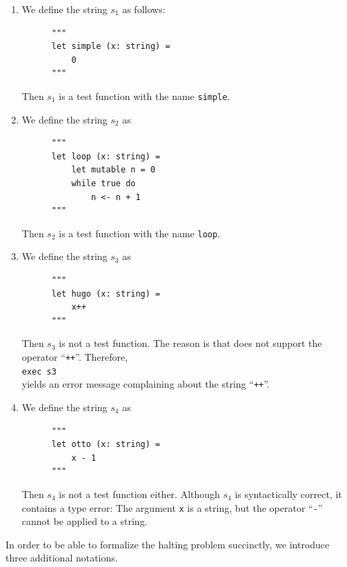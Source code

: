 \examplesEng
\begin{enumerate}
\item We define the string $s_1$ as follows:
      \begin{verbatim}
      """
      let simple (x: string) = 
          0
      """
      \end{verbatim}
      \vspace*{-0.8cm}

      Then $s_1$ is a test function with the name \texttt{simple}.
\item We define the string $s_2$ as
      \begin{verbatim}
      """
      let loop (x: string) = 
          let mutable n = 0
          while true do 
              n <- n + 1
      """
      \end{verbatim}
      \vspace*{-0.8cm}

      Then $s_2$ is a test function with the name \texttt{loop}. 
\item We define the string $s_3$ as
      \begin{verbatim}
      """
      let hugo (x: string) =
          x++
      """
      \end{verbatim}
      \vspace*{-0.8cm}

      Then $s_3$ is not a test function.  The reason is that \Fsharp{} does not support the operator
      ``\texttt{++}''.  Therefore, 
      \\[0.2cm]
      \hspace*{1.3cm}
      \texttt{exec s3}
      \\[0.2cm]
      yields an error message complaining about the string ``\texttt{++}''.
\item We define the string $s_4$ as
      \begin{verbatim}
      """
      let otto (x: string) =
          x - 1
      """
      \end{verbatim}
      \vspace*{-0.8cm}

      Then $s_4$ is not a test function either.  Although $s_4$ is syntactically correct, it contains a
      type error:  The argument \texttt{x} is a string, but the operator ``\texttt{-}'' cannot be applied to
      a string.
\end{enumerate}
In order to be able to formalize the halting problem succinctly, we introduce three additional
notations.

